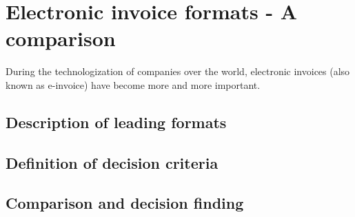 %
% 

\chapter{Electronic invoice formats - A comparison}
\label{InvoiceFormats}

During the technologization of companies over the world, electronic invoices (also known as e-invoice) have become more and more important.

\section{Description of leading formats}

\section{Definition of decision criteria}

\section{Comparison and decision finding}